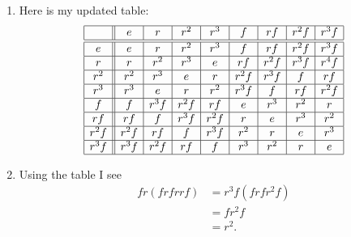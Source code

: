 \documentclass[noauthor,nooutcomes,12pt,hints,handout]{ximera}
\begin{document}
\begin{question}
\begin{enumerate}
  \end{enumerate}
  \begin{freeResponse}
    \begin{enumerate}
      \item Here is my updated table:
  \[
  \begin{array}{|c||c|c|c|c|c|c|c|c|}
    \hline
         & e    & r     & r^2     & r^3      & f      & rf     & r^2f      &  r^3 f\\ \hline\hline
    e    & e    & r     & r^2     & r^3      & f      & rf     & r^2f      &  r^3 f\\ \hline
    r    & r    & r^2   & r^3     & e        & rf     & r^2f   & r^3f      & r^4f\\ \hline
    r^2  & r^2  & r^3   & e       & r        & r^2f   & r^3f   &    f      & r  f\\ \hline
    r^3  & r^3  & e     & r       & r^2      & r^3f   &    f   & r  f      & r^2f\\ \hline
    f    & f    & r^3f  & r^2f    & rf       & e      & r^3    & r^2       & r    \\ \hline
    rf   & rf   &  f    & r^3f    & r^2f     & r      & e      & r^3       & r^2   \\ \hline
    r^2f & r^2f & r f   & f       & r^3f     & r^2    & r      & e         & r^3     \\ \hline
    r^3f & r^3f & r^2f  & rf      & f        & r^3    & r^2    & r         & e       \\ \hline
  \end{array}
  \]
\item Using the table I see
  \begin{align*}
    fr(frfrrf) &= r^3f(frfr^2f)\\
    &=fr^2f\\
    &=r^2.
  \end{align*}
    \end{enumerate}
  \end{freeResponse}
\end{question}
\end{document}
